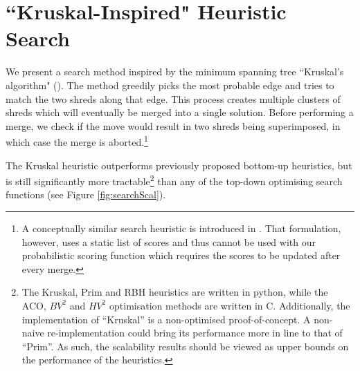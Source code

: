 \documentclass{llncs}
\begin{document}
\section{``Kruskal-Inspired" Heuristic Search}
We present a search method inspired by the minimum spanning tree ``Kruskal's algorithm" (\cite{P13}). The method greedily picks the most probable edge and tries to match the two shreds along that edge. This process creates multiple clusters of shreds which will eventually be merged into a single solution. Before performing a merge, we check if the move would result in two shreds being superimposed, in which case the merge is aborted.\footnote{A conceptually similar search heuristic is introduced in \cite{P5}. That formulation, however, uses a static list of scores and thus cannot be used with our probabilistic scoring function which requires the scores to be updated after every merge.} 

The Kruskal heuristic outperforms previously proposed bottom-up heuristics, but is still significantly more tractable\footnote{The Kruskal, Prim and RBH heuristics are written in python, while the ACO, $BV^2$ and $HV^2$ optimisation methods are written in C. Additionally, the implementation of “Kruskal” is a non-optimised proof-of-concept. A non-naive re-implementation could bring its performance more in line to that of “Prim”. As such, the scalability results should be viewed as upper bounds on the performance of the heuristics.}  than any of the top-down optimising search functions (see Figure \ref{fig:searchScal}).
\end{document}
